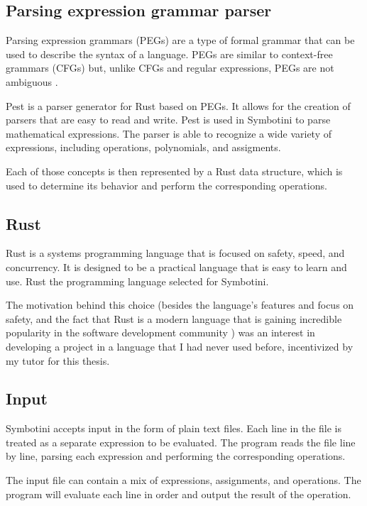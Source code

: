\subsection{Parsing expression grammar parser}\label{subsec:peg-parser}

Parsing expression grammars (PEGs) are a type of formal grammar that can be used to describe the syntax of a language. PEGs are similar to context-free grammars (CFGs) but, unlike CFGs and regular expressions, PEGs are not ambiguous \parencite{pest-book,ford2004parsing}.

Pest \parencite{pest-book} is a parser generator for Rust based on PEGs. It allows for the creation of parsers that are easy to read and write. Pest is used in Symbotini to parse mathematical expressions. The parser is able to recognize a wide variety of expressions, including operations, polynomials, and assigments.

Each of those concepts is then represented by a Rust data structure, which is used to determine its behavior and perform the corresponding operations.

\subsection{Rust}\label{subsec:rust}

Rust \parencite{matsakis2014rust} is a systems programming language that is focused on safety, speed, and concurrency. It is designed to be a practical language that is easy to learn and use. Rust the programming language selected for Symbotini.

The motivation behind this choice (besides the language's features and focus on safety, and the fact that Rust is a modern language that is gaining incredible popularity in the software development community \parencite{stack-overflow-survey}) was an interest in developing a project in a language that I had never used before, incentivized by my tutor for this thesis.

\subsection{Input}\label{subsec:input}

Symbotini accepts input in the form of plain text files. Each line in the file is treated as a separate expression to be evaluated. The program reads the file line by line, parsing each expression and performing the corresponding operations.

The input file can contain a mix of expressions, assignments, and operations. The program will evaluate each line in order and output the result of the operation.

